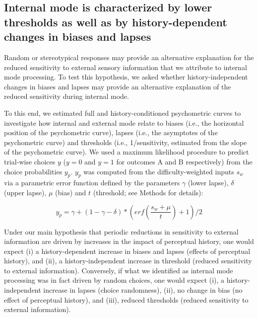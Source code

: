 \documentclass[
]{article}
\begin{document}
\hypertarget{internal-mode-is-characterized-by-lower-thresholds-as-well-as-by-history-dependent-changes-in-biases-and-lapses}{%
\subsection{Internal mode is characterized by lower thresholds as well
as by history-dependent changes in biases and
lapses}\label{internal-mode-is-characterized-by-lower-thresholds-as-well-as-by-history-dependent-changes-in-biases-and-lapses}}

Random or stereotypical responses may provide an alternative explanation
for the reduced sensitivity to external sensory information that we
attribute to internal mode processing. To test this hypothesis, we asked
whether history-independent changes in biases and lapses may provide an
alternative explanation of the reduced sensitivity during internal mode.

To this end, we estimated full and history-conditioned psychometric
curves to investigate how internal and external mode relate to biases
(i.e., the horizontal position of the psychometric curve), lapses (i.e.,
the asymptotes of the psychometric curve) and thresholds (i.e.,
1/sensitivity, estimated from the slope of the psychometric curve). We
used a maximum likelihood procedure to predict trial-wise choices \(y\)
(\(y = 0\) and \(y = 1\) for outcomes A and B respectively) from the
choice probabilities \(y_p\). \(y_p\) was computed from the
difficulty-weighted inputs \(s_w\) via a parametric error function
defined by the parameters \(\gamma\) (lower lapse), \(\delta\) (upper
lapse), \(\mu\) (bias) and \(t\) (threshold; see Methods for details):

\begin{equation}
y_p = \gamma + (1 - \gamma - \delta) *  (erf(\frac{s_w + \mu}{t}) + 1) / 2
\end{equation}

Under our main hypothesis that periodic reductions in sensitivity to
external information are driven by increases in the impact of perceptual
history, one would expect (i) a history-dependent increase in biases and
lapses (effects of perceptual history), and (ii), a history-independent
increase in threshold (reduced sensitivity to external information).
Conversely, if what we identified as internal mode processing was in
fact driven by random choices, one would expect (i), a
history-independent increase in lapses (choice randomness), (ii), no
change in bias (no effect of perceptual history), and (iii), reduced
thresholds (reduced sensitivity to external information).
\end{document}
